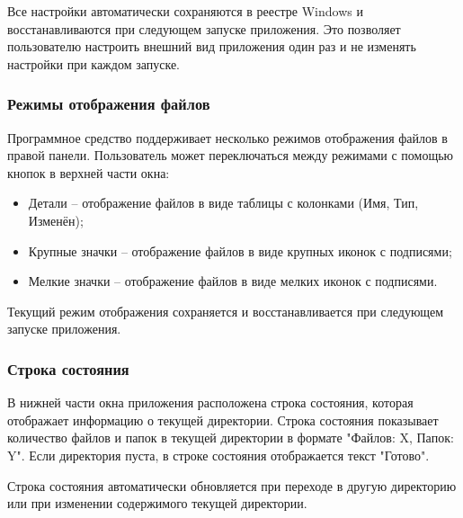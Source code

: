 Все настройки автоматически сохраняются в реестре Windows и восстанавливаются при следующем запуске приложения. Это позволяет пользователю настроить внешний вид приложения один раз и не изменять настройки при каждом запуске.

\subsubsection{Режимы отображения файлов}

Программное средство поддерживает несколько режимов отображения файлов в правой панели. Пользователь может переключаться между режимами с помощью кнопок в верхней части окна:

\begin{itemize}
    \item Детали -- отображение файлов в виде таблицы с колонками (Имя, Тип, Изменён);
    \item Крупные значки -- отображение файлов в виде крупных иконок с подписями;
    \item Мелкие значки -- отображение файлов в виде мелких иконок с подписями.
\end{itemize}

Текущий режим отображения сохраняется и восстанавливается при следующем запуске приложения.

\subsubsection{Строка состояния}

В нижней части окна приложения расположена строка состояния, которая отображает информацию о текущей директории. Строка состояния показывает количество файлов и папок в текущей директории в формате "Файлов: X, Папок: Y". Если директория пуста, в строке состояния отображается текст "Готово".

Строка состояния автоматически обновляется при переходе в другую директорию или при изменении содержимого текущей директории.